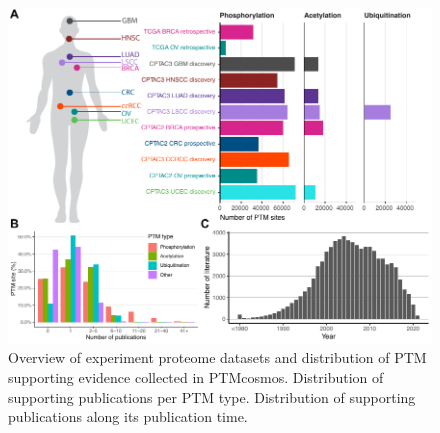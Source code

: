 \begin{figure}[tbp]
    \centering
    \includegraphics[width=\linewidth]{figures/chap03_ptmcosmos/figure1_ptmcosmos_stats.pdf}
    \caption[Overview of experiment proteome datasets and distribution of PTM supporting evidence collected in PTMcosmos.]{%
        Overview of experiment proteome datasets  and distribution of PTM supporting evidence collected in PTMcosmos.
        Distribution of supporting publications per PTM type.
        Distribution of supporting publications along its publication time.
    }
    \label{fig:ptmcosmos-stats}
\end{figure}


